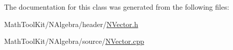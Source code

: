 The documentation for this class was generated from the following files\+:\begin{DoxyCompactItemize}
\item 
Math\+Tool\+Kit/\+N\+Algebra/header/\mbox{\hyperlink{_n_vector_8h}{N\+Vector.\+h}}\item 
Math\+Tool\+Kit/\+N\+Algebra/source/\mbox{\hyperlink{_n_vector_8cpp}{N\+Vector.\+cpp}}\end{DoxyCompactItemize}
